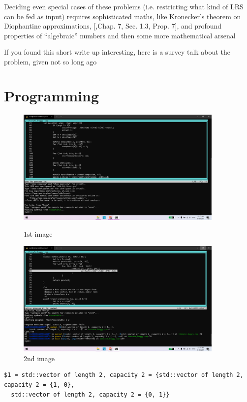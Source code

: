 \documentclass{article}
\begin{document}
Deciding even special cases of these problems (i.e. restricting what kind of LRS can be fed as input) requires sophisticated maths, like Kronecker’s theorem on Diophantine approximations, [\cite{topology},Chap. 7, Sec. 1.3, Prop. 7], and profound properties of “algebraic” numbers \cite{algebra} and then some more mathematical arsenal \cite{recurrence,geometry}

If you found this short write up interesting, here is a survey talk about the problem, given not so long ago
\newpage
\section{Programming}

 \begin{figure}[!htb]
 \RawFloats
	\centering
	\begin{minipage}{.5\columnwidth}
		\centering
		\includegraphics[width=0.9\textwidth]{image1.png}
		\caption{1st image}
		\label{label1}
	\end{minipage}%
	\begin{minipage}{.5\columnwidth}
		\centering
		\includegraphics[width=0.9\textwidth]{image2.png}
		\caption{2nd image}
		\label{label2}
	\end{minipage}
\end{figure}
\vspace{1.5em}
\begin{verbatim}
$1 = std::vector of length 2, capacity 2 = {std::vector of length 2, capacity 2 = {1, 0},
  std::vector of length 2, capacity 2 = {0, 1}}
\end{verbatim}
\end{document}
